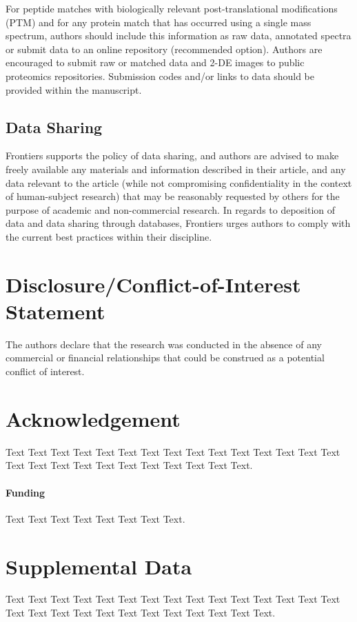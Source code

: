 \documentclass{frontiersENG} %
\begin{document}
For peptide matches with biologically relevant post-translational modifications (PTM) and for any protein match that has occurred using a single mass spectrum, authors should include this information as raw data, annotated spectra or submit data to an online repository (recommended option).
Authors are encouraged to submit raw or matched data and 2-DE images to public proteomics repositories. Submission codes and/or links to data should be provided within the manuscript.

\subsection{Data Sharing}

Frontiers supports the policy of data sharing, and authors are advised to make freely available any materials and information described in their article, and any data relevant to the article (while not compromising confidentiality in the context of human-subject research) that may be reasonably requested by others for the purpose of academic and non-commercial research. In regards to deposition of data and data sharing through databases, Frontiers urges authors to comply with the current best practices within their discipline.

\section*{Disclosure/Conflict-of-Interest Statement}
The authors declare that the research was conducted in the absence of any commercial or financial relationships that could be construed as a potential conflict of interest.

\section*{Acknowledgement}
Text Text Text Text Text Text  Text Text Text Text Text Text Text Text  Text Text Text Text Text Text Text Text Text  Text Text Text.

\paragraph{Funding\textcolon} Text Text Text Text Text Text  Text Text.

\section*{Supplemental Data}
Text Text Text Text Text Text  Text Text Text Text Text Text Text Text Text  Text Text Text Text Text Text Text Text Text  Text Text Text.


\end{document}
